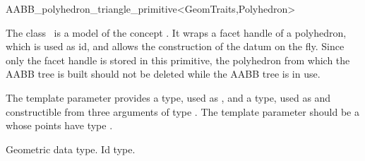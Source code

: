 \ccRefPageBegin


\begin{ccRefClass}{AABB_polyhedron_triangle_primitive<GeomTraits,Polyhedron>}


\ccDefinition
  
The class \ccRefName\ is a model of the concept . It wraps a facet handle of a polyhedron, which is used as id, and allows the construction of the datum on the fly. Since only the facet handle is stored in this primitive, the polyhedron from which the AABB tree is built should not be deleted while the AABB tree is in use.

\ccParameters
The template parameter  provides a  type, used as , and a  type, used as  and constructible from three arguments of type . The template parameter  should be a  whose points have type .


\ccTypes

          {Geometric data type.}
\ccGlue
{}
          {Id type.}



\ccSeeAlso

\\


\end{ccRefClass}

\ccRefPageEnd

